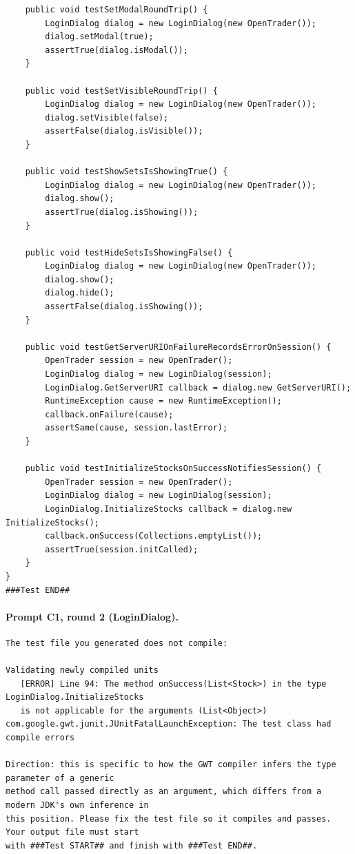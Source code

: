 \begin{lstlisting}
    public void testSetModalRoundTrip() {
        LoginDialog dialog = new LoginDialog(new OpenTrader());
        dialog.setModal(true);
        assertTrue(dialog.isModal());
    }

    public void testSetVisibleRoundTrip() {
        LoginDialog dialog = new LoginDialog(new OpenTrader());
        dialog.setVisible(false);
        assertFalse(dialog.isVisible());
    }

    public void testShowSetsIsShowingTrue() {
        LoginDialog dialog = new LoginDialog(new OpenTrader());
        dialog.show();
        assertTrue(dialog.isShowing());
    }

    public void testHideSetsIsShowingFalse() {
        LoginDialog dialog = new LoginDialog(new OpenTrader());
        dialog.show();
        dialog.hide();
        assertFalse(dialog.isShowing());
    }

    public void testGetServerURIOnFailureRecordsErrorOnSession() {
        OpenTrader session = new OpenTrader();
        LoginDialog dialog = new LoginDialog(session);
        LoginDialog.GetServerURI callback = dialog.new GetServerURI();
        RuntimeException cause = new RuntimeException();
        callback.onFailure(cause);
        assertSame(cause, session.lastError);
    }

    public void testInitializeStocksOnSuccessNotifiesSession() {
        OpenTrader session = new OpenTrader();
        LoginDialog dialog = new LoginDialog(session);
        LoginDialog.InitializeStocks callback = dialog.new InitializeStocks();
        callback.onSuccess(Collections.emptyList());
        assertTrue(session.initCalled);
    }
}
###Test END##
\end{lstlisting}

\paragraph*{Prompt C1, round 2 (LoginDialog).}
\label{prompt:ld-c1-r2}
\begin{lstlisting}
The test file you generated does not compile:

Validating newly compiled units
   [ERROR] Line 94: The method onSuccess(List<Stock>) in the type LoginDialog.InitializeStocks
   is not applicable for the arguments (List<Object>)
com.google.gwt.junit.JUnitFatalLaunchException: The test class had compile errors

Direction: this is specific to how the GWT compiler infers the type parameter of a generic
method call passed directly as an argument, which differs from a modern JDK's own inference in
this position. Please fix the test file so it compiles and passes. Your output file must start
with ###Test START## and finish with ###Test END##.
\end{lstlisting}

